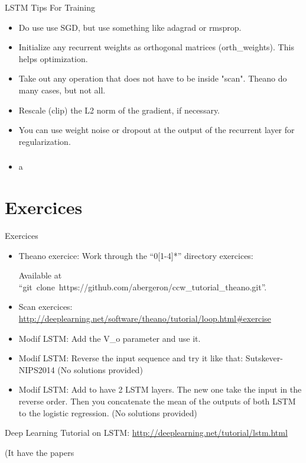 \documentclass[utf8x,xcolor=pdftex,dvipsnames,table]{beamer}
\begin{document}
\begin{frame}{LSTM Tips For Training}
\begin{itemize}
\item Do use use SGD, but use something like adagrad or rmsprop.
\item Initialize any recurrent weights as orthogonal matrices (orth\_weights). This helps optimization.
\item Take out any operation that does not have to be inside "scan".
      Theano do many cases, but not all.
\item Rescale (clip) the L2 norm of the gradient, if necessary.
\item You can use weight noise or dropout at the output of the recurrent layer for regularization.
\end{itemize}
\end{frame}

\begin{frame}
  \frametitle{}
\begin{itemize}
\item a
\end{itemize}
\end{frame}

\section{Exercices}
\begin{frame}{Exercices}
\begin{itemize}
  \item Theano exercice: Work through the ``0[1-4]*'' directory exercices:

    Available at ``git~clone~https://github.com/abergeron/ccw\_tutorial\_theano.git''.

  \item Scan exercices: \url{http://deeplearning.net/software/theano/tutorial/loop.html\#exercise}

  \item Modif LSTM: Add the V\_o parameter and use it.
  \item Modif LSTM: Reverse the input sequence and try it like that:
        Sutskever-NIPS2014 (No solutions provided)
  \item Modif LSTM: Add to have 2 LSTM layers. The new one take the
    input in the reverse order. Then you concatenate the mean of the
    outputs of both LSTM to the logistic regression. (No solutions provided)
\end{itemize}

Deep Learning Tutorial on LSTM: \url{http://deeplearning.net/tutorial/lstm.html}

(It have the papers
\end{frame}
\end{document}

